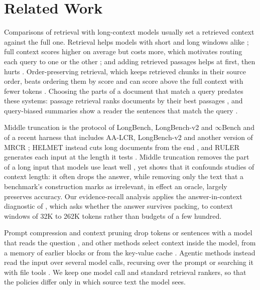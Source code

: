 \documentclass[letterpaper]{article} %
\begin{document}
\section{Related Work}
Comparisons of retrieval with long-context models usually set a retrieved context against the full one. Retrieval helps models with short and long windows alike \cite{xu2024retrieval}; full context scores higher on average but costs more, which motivates routing each query to one or the other \cite{li2024selfroute}; and adding retrieved passages helps at first, then hurts \cite{jin2025longcontext}. Order-preserving retrieval, which keeps retrieved chunks in their source order, beats ordering them by score \cite{yu2024oprag,laitenberger2025dosrag} and can score above the full context with fewer tokens \cite{yu2024oprag,bai2025longbenchv2}. Choosing the parts of a document that match a query predates these systems: passage retrieval ranks documents by their best passages \cite{callan1994passage,kaszkiel1997passage}, and query-biased summaries show a reader the sentences that match the query \cite{tombros1998query}.

Middle truncation is the protocol of LongBench, LongBench-v2 and $\infty$Bench \cite{bai2024longbench,bai2025longbenchv2,zhang2024infinitebench} and of a recent harness that includes AA-LCR, LongBench-v2 and another version of MRCR \cite{huang2026atlas}; HELMET instead cuts long documents from the end \cite{yen2025helmet}, and RULER generates each input at the length it tests \cite{hsieh2024ruler}. Middle truncation removes the part of a long input that models use least well \cite{liu2024lost}, yet \citet{arjmandi2026distractor} shows that it confounds studies of context length: it often drops the answer, while removing only the text that a benchmark's construction marks as irrelevant, in effect an oracle, largely preserves accuracy. Our evidence-recall analysis applies the answer-in-context diagnostic of \citet{bala2026recall}, which asks whether the answer survives packing, to context windows of 32K to 262K tokens rather than budgets of a few hundred.

Prompt compression and context pruning drop tokens or sentences with a model that reads the question \cite{jiang2024longllmlingua,chirkova2025provence}, and other methods select context inside the model, from a memory of earlier blocks or from the key-value cache \cite{xiao2024infllm,li2024snapkv}. Agentic methods instead read the input over several model calls, recursing over the prompt \cite{zhang2025rlm} or searching it with file tools \cite{belcak2026longcontext}. We keep one model call and standard retrieval rankers, so that the policies differ only in which source text the model sees.
\end{document}
